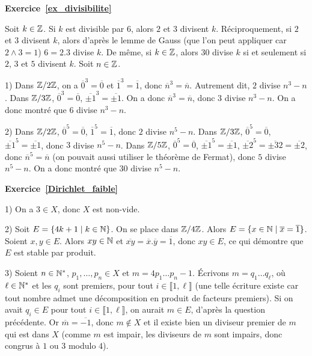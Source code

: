 \documentclass[11pt,a4paper]{article}
\begin{document}
\textbf{Exercice~\ref{ex_divisibilite}}

Soit $k\in \mathbb{Z}$. Si $k$ est divisible par $6$, alors $2$ et $3$ divisent $k$. Réciproquement, si $2$ et $3$ divisent $k$, alors d'après le lemme de Gauss  (que l'on peut appliquer car $2\wedge 3 =1$) $6=2.3$ divise $k$. De même, si $k\in \mathbb{Z}$, alors $30$ divise $k$ si et seulement si $2$, $3$ et $5$ divisent $k$. Soit $n\in \mathbb{Z}$. 

1) Dans $\mathbb{Z}/2\mathbb{Z}$, on a $\overline{0}^3=\overline{0}$ et $\overline{1}^3=\overline{1}$, donc $\overline{n}^3=\overline{n}$. Autrement dit, $2$ divise $n^3-n$. Dans $\mathbb{Z}/3\mathbb{Z}$, $\overline{0}^3=\overline{0}$, $\overline{\pm 1}^3=\overline{\pm 1}$. On a donc $\overline{n}^3=\overline{n}$, donc $3$ divise $n^3-n$. On a donc montré que $6$ divise $n^3-n$.

2) Dans $\mathbb{Z}/2\mathbb{Z}$, $\overline{0}^5=\overline{0}$, $\overline{1}^5=\overline{1}$, donc $2$ divise $n^5-n$. Dans $\mathbb{Z}/3\mathbb{Z}$, $\overline{0}^5=\overline{0}$, $\overline{\pm 1}^5=\overline{\pm 1}$, donc $3$ divise $n^5-n$. Dans  $\mathbb{Z}/5\mathbb{Z}$, $\overline{0}^5=\overline{0}$, $\overline{\pm 1}^5=\overline{\pm 1}$, $\overline{\pm 2}^5=\overline{\pm 32}=\overline{\pm 2}$, donc $\overline{n}^5=\overline{n}$ (on pouvait aussi utiliser le théorème de Fermat), donc $5$ divise $n^5-n$. On a donc montré que $30$ divise $n^5-n$. 






\textbf{\textbf{Exercice}~\ref{Dirichlet_faible}}

1) On a $3\in X$, donc $X$ est non-vide.

2) Soit $E=\{ 4k+1\mid k\in \mathbb{N}\}$. On se place dans $\mathbb{Z}/4\mathbb{Z}$. Alors $E=\{x\in \mathbb{N}\mid \overline{x}=\overline{1}\}$. Soient $x,y\in E$. Alors $xy\in \mathbb{N}$ et $\overline{xy}=\overline{x}.\overline{y}=\overline{1}$, donc $xy\in E$, ce qui démontre que $E$ est stable par produit.

3) Soient $n\in \mathbb{N}^*$,  $p_1,\ldots,p_n\in X$ et $m=4p_1\ldots p_n-1$. Écrivons $m=q_1\ldots q_\ell$, où $\ell\in \mathbb{N}^*$ et les $q_i$ sont premiers, pour tout $i\in \llbracket 1,\ell\rrbracket$ (une telle écriture existe car tout nombre admet une décomposition en produit de facteurs premiers). Si on avait $q_i\in E$ pour tout $i\in \llbracket 1,\ell\rrbracket$, on aurait $m\in E$, d'après la question précédente. Or $\overline{m}=\overline{-1}$, donc $m\notin X$ et il existe bien un diviseur premier de $m$ qui est dans $X$ (comme $m$ est impair, les diviseurs de $m$ sont impairs, donc congrus à $1$ ou $3$ modulo $4$). 
\end{document}
